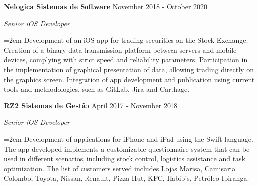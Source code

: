 \documentclass[paper=a4,fontsize=11pt]{scrartcl} %
\newcommand{\sepspace}{\vspace*{1em}}		%
\newcommand{\EducationEntry}[4]{
		\noindent \textbf{#1} \hfill      %
        #2 \par
		\noindent \textit{#3} \par        %
		\noindent\hangindent=2em\hangafter=0 \small #4 %
		\normalsize \par}
\newcommand{\WorkEntry}[4]{				  %
		\noindent \textbf{#1} \hfill      %
        #2 \par
		\noindent \textit{#3} \par        %
		\noindent\hangindent=2em\hangafter=0 \small #4 %
		\normalsize \par}
\begin{document}

\sepspace
\sepspace

\WorkEntry
  {Nelogica Sistemas de Software}
  {November 2018 - October 2020}
  {Senior iOS Developer}
  {Development of an iOS app for trading securities on the Stock Exchange. Creation of a binary data transmission platform between servers and mobile devices, complying with strict speed and reliability parameters. Participation in the implementation of graphical presentation of data, allowing trading directly on the graphics screen. Integration of app development and publication using current tools and methodologies, such as GitLab, Jira and Carthage.}


\newpage

\WorkEntry
  {RZ2 Sistemas de Gestão}
  {April 2017 - November 2018}
  {Senior iOS Developer}
  {Development of applications for iPhone and iPad using the Swift language. The app developed implements a customizable questionnaire system that can be used in different scenarios, including stock control, logistics assistance and task optimization. The list of customers served includes Lojas Marisa, Camisaria Colombo, Toyota, Nissan, Renault, Pizza Hut, KFC, Habib’s, Petróleo Ipiranga.}
\end{document}
